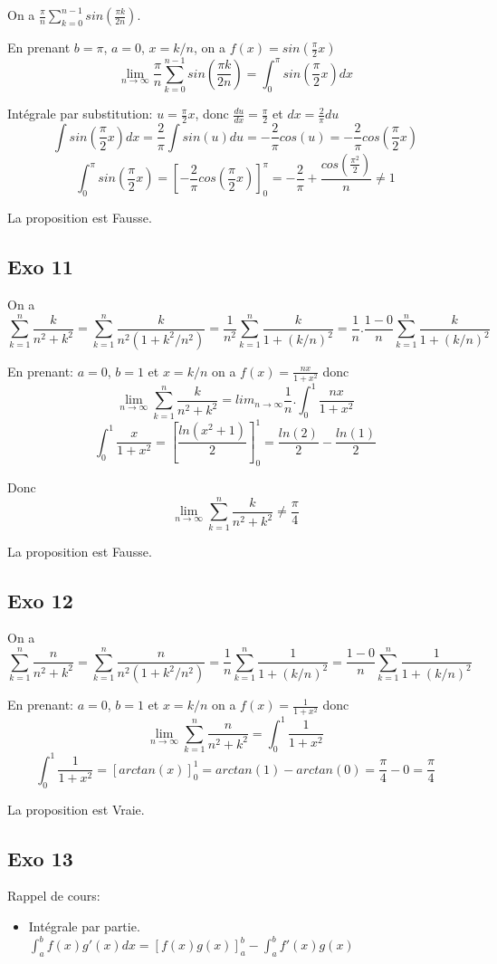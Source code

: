 \documentclass[]{book}
\theoremstyle{definition}
\begin{document}
On a $\frac{\pi}{n}\sum_{k=0}^{n-1} sin(\frac{\pi k}{2n})$.

En prenant $b=\pi$, $a=0$, $x=k/n$, on a $f(x) = sin(\frac{\pi}{2}x)$
$$\lim_{n \to \infty}\frac{\pi}{n}\sum_{k=0}^{n-1}sin(\frac{\pi k}{2n}) = \int_0^{\pi}sin(\frac{\pi}{2}x)dx$$

Int\'egrale par substitution: $u=\frac{\pi}{2}x$, donc $\frac{du}{dx} = \frac{\pi}{2}$ et $dx=\frac{2}{\pi}du$
$$\int sin(\frac{\pi}{2}x)dx = \frac{2}{\pi}\int sin(u)du = -\frac{2}{\pi}cos(u) = -\frac{2}{\pi}cos(\frac{\pi}{2}x)$$
$$\int_0^{\pi} sin(\frac{\pi}{2}x) = [-\frac{2}{\pi}cos(\frac{\pi}{2}x)]_0^{\pi} = -\frac{2}{\pi} + \frac{cos(\frac{\pi^2}{2})}{n} \neq 1$$


La proposition est Fausse.

\subsection*{Exo 11}
On a $$\sum_{k=1}^{n}\frac{k}{n^2+k^2} = \sum_{k=1}^{n}\frac{k}{n^2(1+k^2/n^2)} = \frac{1}{n^2}\sum_{k=1}^{n}\frac{k}{1+(k/n)^2} = \frac{1}{n}.\frac{1-0}{n}\sum_{k=1}^{n}\frac{k}{1+(k/n)^2}$$

En prenant: $a=0$, $b=1$ et $x=k/n$ on a $f(x)=\frac{nx}{1+x^2}$ donc
$$\lim_{n \to \infty}\sum_{k=1}^{n}\frac{k}{n^2+k^2} = lim_{n \to \infty}\frac{1}{n}.\int_0^1 \frac{nx}{1+x^2}$$
$$\int_0^1 \frac{x}{1+x^2} = [\frac{ln(x^2+1)}{2}]_0^1 = \frac{ln(2)}{2} - \frac{ln(1)}{2}$$

Donc
$$ \lim_{n \to \infty}\sum_{k=1}^{n}\frac{k}{n^2+k^2} \neq \frac{\pi}{4}$$

La proposition est Fausse.

\subsection*{Exo 12}
On a $$\sum_{k=1}^{n}\frac{n}{n^2+k^2} = \sum_{k=1}^{n}\frac{n}{n^2(1+k^2/n^2)} = \frac{1}{n}\sum_{k=1}^{n}\frac{1}{1+(k/n)^2} = \frac{1-0}{n}\sum_{k=1}^{n}\frac{1}{1+(k/n)^2}$$

En prenant: $a=0$, $b=1$ et $x=k/n$ on a $f(x)=\frac{1}{1+x^2}$ donc
$$\lim_{n \to \infty}\sum_{k=1}^{n}\frac{n}{n^2+k^2} = \int_0^1 \frac{1}{1+x^2}$$
$$\int_0^1 \frac{1}{1+x^2} = [arctan(x)]_0^1 = arctan(1) - arctan(0) = \frac{\pi}{4} - 0 = \frac{\pi}{4}$$

La proposition est Vraie.

\subsection*{Exo 13}
Rappel de cours:
\begin{itemize}
\item Int\'egrale par partie. $\int_{a}^{b} f(x)g'(x)dx = [f(x)g(x)]_{a}^{b} - \int_{a}^{b}f'(x)g(x)$
\end{itemize}
\end{document}
